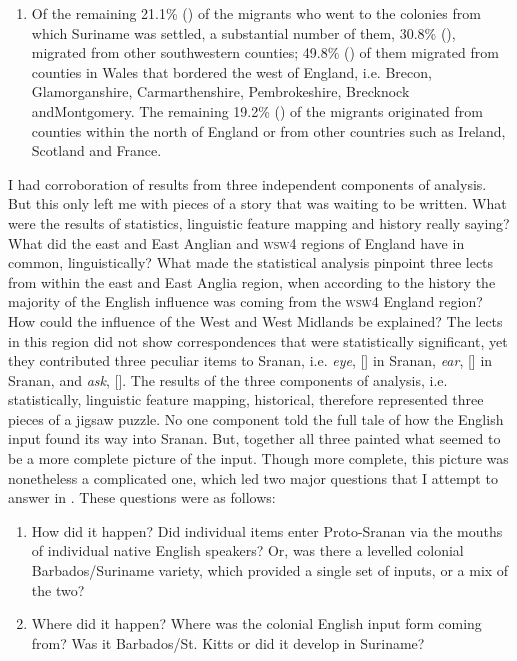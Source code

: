 \begin{enumerate}
\item{Of the remaining 21.1\% ()  of the migrants who went to the colonies from which Suriname was settled, a substantial number of them, 30.8\% (), migrated from other southwestern counties; 49.8\% () of them migrated from counties in Wales that bordered the west of England, i.e. Brecon, Glamorganshire, Carmarthenshire, Pembrokeshire, Brecknock and\linebreak Montgomery. The remaining 19.2\% () of the migrants originated from counties within the north of England or from other countries such as Ireland, Scotland and France.}
\end{enumerate}

I had corroboration of results from three independent components of analysis. But this only left me with pieces of a story that was waiting to be written. What were the results of statistics, linguistic feature mapping and history really saying? What did the east and East Anglian and \textsc{wsw4} regions of England have in common, linguistically? What made the statistical analysis pinpoint three lects from within the east and East Anglia region, when according to the history the majority of the English influence was coming from the \textsc{wsw4} England region? How could the influence of the West and West Midlands be explained? The lects in this region did not show correspondences that were statistically significant, yet they contributed three peculiar items to Sranan, i.e. \emph{eye}, [] in Sranan, \emph{ear}, [] in Sranan, and \emph{ask}, [].
The results of the three components of analysis, i.e. statistically, linguistic feature mapping, historical, therefore represented three pieces of a jigsaw puzzle. No one component told the full tale of how the English input found its way into Sranan. But, together all three painted what seemed to be a more complete picture of the input. Though more complete, this picture was nonetheless a complicated one, which led two major questions that I attempt to answer in . These questions were as follows:

\begin{enumerate}
\item{How did it happen? Did individual items enter Proto-Sranan via the mouths of individual native English speakers? Or, was there a levelled colonial Barbados/Suriname variety, which provided a single set of inputs, or a mix of the two?}
\item{Where did it happen? Where was the colonial English input form coming from? Was it Barbados/St. Kitts or did it develop in Suriname?}
\end{enumerate}
